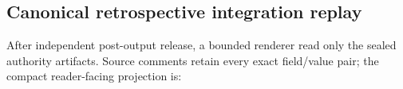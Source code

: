 
\subsection{Canonical retrospective integration replay}

\begingroup
\scriptsize
After independent post-output release, a bounded renderer read only the sealed
authority artifacts.  Source comments retain every exact field/value pair;
the compact reader-facing projection is:
\smallskip


